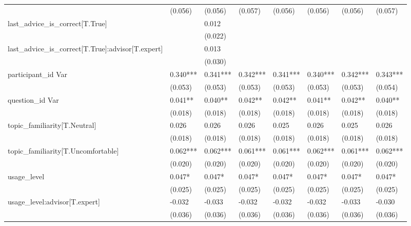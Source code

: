 \begin{table}
\begin{center}
\begin{tabular}{llllllll}
                                                    & (0.056)  & (0.056)  & (0.057)  & (0.056)  & (0.056)  & (0.056)  & (0.057)   \\
last\_advice\_is\_correct[T.True]                   &          & 0.012    &          &          &          &          &           \\
                                                    &          & (0.022)  &          &          &          &          &           \\
last\_advice\_is\_correct[T.True]:advisor[T.expert] &          & 0.013    &          &          &          &          &           \\
                                                    &          & (0.030)  &          &          &          &          &           \\
participant\_id Var                                 & 0.340*** & 0.341*** & 0.342*** & 0.341*** & 0.340*** & 0.342*** & 0.343***  \\
                                                    & (0.053)  & (0.053)  & (0.053)  & (0.053)  & (0.053)  & (0.053)  & (0.054)   \\
question\_id Var                                    & 0.041**  & 0.040**  & 0.042**  & 0.042**  & 0.041**  & 0.042**  & 0.040**   \\
                                                    & (0.018)  & (0.018)  & (0.018)  & (0.018)  & (0.018)  & (0.018)  & (0.018)   \\
topic\_familiarity[T.Neutral]                       & 0.026    & 0.026    & 0.026    & 0.025    & 0.026    & 0.025    & 0.026     \\
                                                    & (0.018)  & (0.018)  & (0.018)  & (0.018)  & (0.018)  & (0.018)  & (0.018)   \\
topic\_familiarity[T.Uncomfortable]                 & 0.062*** & 0.062*** & 0.061*** & 0.061*** & 0.062*** & 0.061*** & 0.062***  \\
                                                    & (0.020)  & (0.020)  & (0.020)  & (0.020)  & (0.020)  & (0.020)  & (0.020)   \\
usage\_level                                        & 0.047*   & 0.047*   & 0.047*   & 0.047*   & 0.047*   & 0.047*   & 0.047*    \\
                                                    & (0.025)  & (0.025)  & (0.025)  & (0.025)  & (0.025)  & (0.025)  & (0.025)   \\
usage\_level:advisor[T.expert]                      & -0.032   & -0.033   & -0.032   & -0.032   & -0.032   & -0.033   & -0.030    \\
                                                    & (0.036)  & (0.036)  & (0.036)  & (0.036)  & (0.036)  & (0.036)  & (0.036)   \\
\hline
\end{tabular}
\end{center}
\end{table}